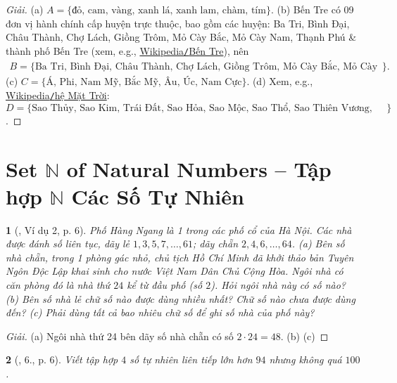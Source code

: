 \documentclass{article}
\newtheorem{baitoan}{}
\begin{document}
\begin{proof}[Giải]
	(a) $A = \{\mbox{đỏ, cam, vàng, xanh lá, xanh lam, chàm, tím}\}$. (b) Bến Tre có 09 đơn vị hành chính cấp huyện trực thuộc, bao gồm các huyện: Ba Tri, Bình Đại, Châu Thành, Chợ Lách, Giồng Trôm, Mỏ Cày Bắc, Mỏ Cày Nam, Thạnh Phú \& thành phố Bến Tre (xem, e.g., \href{https://vi.wikipedia.org/wiki/B%E1%BA%BFn_Tre}{Wikipedia{\tt/}Bến Tre}), nên
	\begin{align*}
		B = \{\mbox{Ba Tri, Bình Đại, Châu Thành, Chợ Lách, Giồng Trôm, Mỏ Cày Bắc, Mỏ Cày Nam, Thạnh Phú, thành phố Bến Tre}\}.
	\end{align*}
	(c) $C = \{\mbox{Á, Phi, Nam Mỹ, Bắc Mỹ, Âu, Úc, Nam Cực}\}$. (d) Xem, e.g., \href{https://vi.wikipedia.org/wiki/H%E1%BB%87_M%E1%BA%B7t_Tr%E1%BB%9Di}{Wikipedia{\tt/}hệ Mặt Trời}:\\$D = \{\mbox{Sao Thủy, Sao Kim, Trái Đất, Sao Hỏa, Sao Mộc, Sao Thổ, Sao Thiên Vương, Sao Hải Vương}\}$.
\end{proof}


\section{Set $\mathbb{N}$ of Natural Numbers -- Tập hợp $\mathbb{N}$ Các Số Tự Nhiên}

\begin{baitoan}[\cite{Tuyen_Toan_6}, Ví dụ 2, p. 6]
	Phố Hàng Ngang là 1 trong các phố cổ của Hà Nội. Các nhà được đánh số liên tục, dãy lẻ $1,3,5,7,\ldots,61$; dãy chẵn $2,4,6,\ldots,64$. (a) Bên số nhà chẵn, trong 1 phòng gác nhỏ, chủ tịch Hồ Chí Minh đã khởi thảo bản Tuyên Ngôn Độc Lập khai sinh cho nước Việt Nam Dân Chủ Cộng Hòa. Ngôi nhà có căn phòng đó là nhà thứ $24$ kể từ đầu phố (số $2$). Hỏi ngôi nhà này có số nào? (b) Bên số nhà lẻ chữ số nào được dùng nhiều nhất? Chữ số nào chưa được dùng đến? (c) Phải dùng tất cả bao nhiêu chữ số để ghi số nhà của phố này?
\end{baitoan}

\begin{proof}[Giải]
	(a) Ngôi nhà thứ 24 bên dãy số nhà chẵn có số $2\cdot24 = 48$. (b) (c) 
\end{proof}

\begin{baitoan}[\cite{Tuyen_Toan_6}, 6., p. 6]
	Viết tập hợp $4$ số tự nhiên liên tiếp lớn hơn $94$ nhưng không quá $100$.
\end{baitoan}
\end{document}
